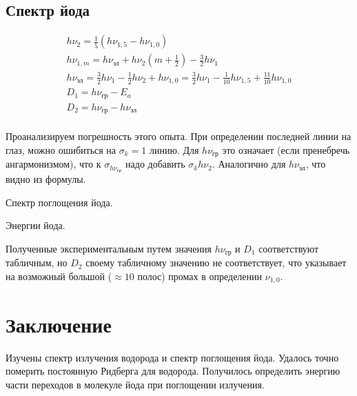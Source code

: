 \documentclass[12pt]{article}
\begin{document}
\subsection{Спектр йода}
\begin{gather*}
    h \nu_2 = \frac{1}{5} \left( h \nu_{1, 5} - h \nu_{1, 0} \right) \\
    h \nu_{1, m} = h \nu_{\text{эл}} + h \nu_2 (m + \frac{1}{2}) - \frac{3}{2} h \nu_1 \\
    h \nu_{\text{эл}} =
        \frac{3}{2} h \nu_1 - \frac{1}{2} h \nu_2 + h \nu_{1, 0} =
        \frac{3}{2} h \nu_1 - \frac{1}{10} h \nu_{1, 5} + \frac{11}{10} h \nu_{1, 0} \\
    D_1 = h \nu_{\text{гр}} - E_a \\
    D_2 = h \nu_{\text{гр}} - h \nu_{\text{эл}} \\
\end{gather*}

Проанализируем погрешность этого опыта. При определении последней линии на глаз, можно ошибиться на $\sigma_k = 1$ линию.
Для $h \nu_{\text{гр}}$ это означает (если пренебречь ангармонизмом), что к $\sigma_{h \nu_{\text{гр}}}$ надо добавить $\sigma_k h \nu_2$.
Аналогично для $h \nu_{\text{эл}}$, что видно из формулы.

\begin{table}[H]
\begin{center}
\caption{Спектр поглощения йода.}

\end{center}
\end{table}

\begin{table}[H]
\begin{center}
\caption{Энергии йода.}

\end{center}
\end{table}

Полученные экспериментальным путем значения $h \nu_{\text{гр}}$ и $D_1$ соответствуют табличным,
но $D_2$ своему табличному значению не соответствует, что указывает на возможный большой ($\approx 10$ полос) промах в определении $\nu_{1, 0}$.

\section{Заключение}
Изучены спектр излучения водорода и спектр поглощения йода. Удалось точно померить постоянную Ридберга для водорода.
Получилось определить энергию части переходов в молекуле йода при поглощении излучения.
\end{document}
